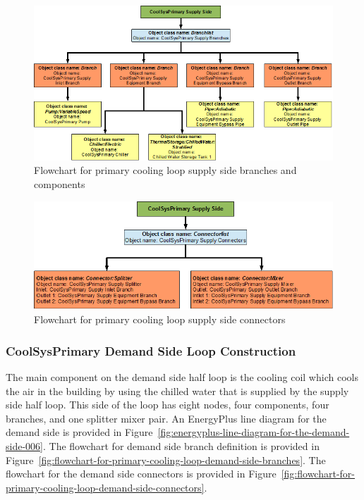 \begin{figure}[htbp] %
\centering
\includegraphics{media/image050.png}
\caption{Flowchart for primary cooling loop supply side branches and components \protect \label{fig:flowchart-for-primary-cooling-loop-supply-side-branches}}
\end{figure}

\begin{figure}[htbp] %
\centering
\includegraphics{media/image051.png}
\caption{Flowchart for primary cooling loop supply side connectors \protect \label{fig:flowchart-for-primary-cooling-loop-supply-side-connectors}}
\end{figure}

\subsubsection{CoolSysPrimary Demand Side Loop Construction}\label{coolsysprimary-demand-side-loop-construction}

The main component on the demand side half loop is the cooling coil which cools the air in the building by using the chilled water that is supplied by the supply side half loop. This side of the loop has eight nodes, four components, four branches, and one splitter mixer pair. An EnergyPlus line diagram for the demand side is provided in Figure~\ref{fig:energyplus-line-diagram-for-the-demand-side-006}. The flowchart for demand side branch definition is provided in Figure~\ref{fig:flowchart-for-primary-cooling-loop-demand-side-branches}. The flowchart for the demand side connectors is provided in Figure~\ref{fig:flowchart-for-primary-cooling-loop-demand-side-connectors}.

